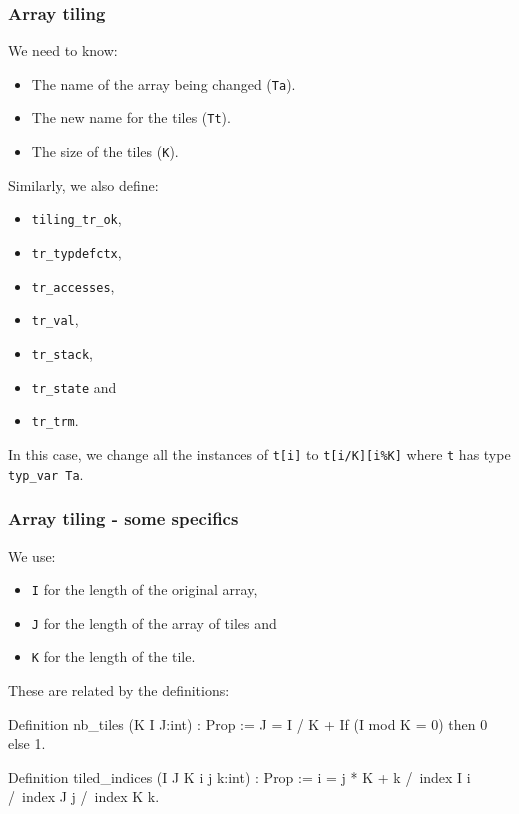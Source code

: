 \begin{frame}[fragile]
\frametitle{Array tiling}

We need to know:
\begin{itemize}
	\item The name of the array being changed (\texttt{Ta}).
	\item The new name for the tiles (\texttt{Tt}).
	\item The size of the tiles (\texttt{K}). 
\end{itemize}

\bigskip

Similarly, we also define:
\\[0.75em]
\begin{minipage}{0.45\linewidth}
\begin{itemize}
	\item \texttt{tiling\_tr\_ok},
	\item \texttt{tr\_typdefctx},
	\item \texttt{tr\_accesses},
	\item \texttt{tr\_val},
\end{itemize}
\end{minipage}%
\begin{minipage}{0.45\linewidth}
\begin{itemize}
	\item \texttt{tr\_stack},
	\item \texttt{tr\_state} and
	\item \texttt{tr\_trm}.
\end{itemize}
\end{minipage}

\bigskip

In this case, we change all the instances of \texttt{t[i]} to \texttt{t[i/K][i\%K]} where \texttt{t} has type \texttt{typ\_var Ta}.

\end{frame}


\begin{frame}[fragile]
\frametitle{Array tiling - some specifics}

We use:
\begin{itemize}
	\item \texttt{I} for the length of the original array,
	\item \texttt{J} for the length of the array of tiles and
	\item \texttt{K} for the length of the tile.
\end{itemize}

\bigskip

These are related by the definitions:

\begin{coq}
Definition nb_tiles (K I J:int) : Prop :=
  J = I / K + If (I mod K = 0) then 0 else 1.

Definition tiled_indices (I J K i j k:int) : Prop :=
		i = j * K + k
	/\	index I i
	/\	index J j
  	/\	index K k.
\end{coq}

\end{frame}


